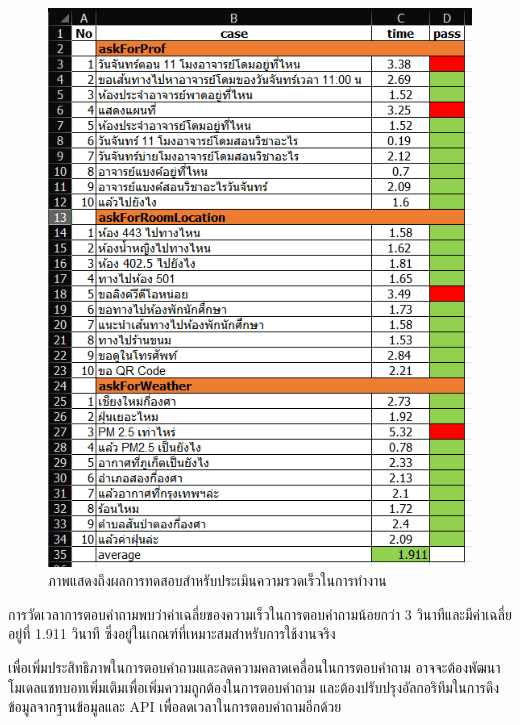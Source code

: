 \begin{figure}[hbt!]
  \begin{center}
    \includegraphics[width=\textwidth,keepaspectratio]{pic/eval_bot_response_time_table.png}
  \end{center}
  \caption{ภาพแสดงถึงผลการทดสอบสำหรับประเมินความรวดเร็วในการทำงาน}
  \label{fig:eval_bot_response_time_table}
\end{figure}

การวัดเวลาการตอบคำถามพบว่าค่าเฉลี่ยของความเร็วในการตอบคำถามน้อยกว่า 3 วินาทีและมีค่าเฉลี่ยอยู่ที่ 1.911 วินาที
ซึ่งอยู่ในเกณฑ์ที่เหมาะสมสำหรับการใช้งานจริง

เพื่อเพิ่มประสิทธิภาพในการตอบคำถามและลดความคลาดเคลื่อนในการตอบคำถาม อาจจะต้องพัฒนาโมเดลแชทบอทเพิ่มเติมเพื่อเพิ่มความถูกต้องในการตอบคำถาม
และต้องปรับปรุงอัลกอริทึมในการดึงข้อมูลจากฐานข้อมูลและ API เพื่อลดเวลาในการตอบคำถามอีกด้วย